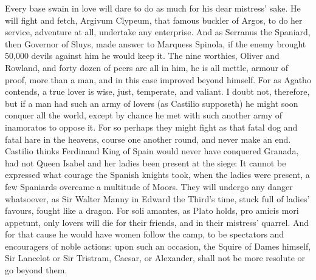 {Every base swain in love will dare to do as much for his dear mistress'
sake. He will fight and fetch, Argivum Clypeum, that famous
buckler of Argos, to do her service, adventure at all, undertake any
enterprise. And as Serranus the Spaniard, then Governor of Sluys, made
answer to Marquess Spinola, if the enemy brought 50,000 devils against
him he would keep it. The nine worthies, Oliver and Rowland, and forty
dozen of peers are all in him, he is all mettle, armour of proof, more
than a man, and in this case improved beyond himself. For as
Agatho contends, a true lover is wise, just, temperate, and
valiant. I doubt not, therefore, but if a man had such an army of
lovers (as Castilio supposeth) he might soon conquer all the world,
except by chance he met with such another army of inamoratos to oppose
it. For so perhaps they might fight as that fatal dog and fatal
hare in the heavens, course one another round, and never make an end.
Castilio thinks Ferdinand King of Spain would never have conquered
Granada, had not Queen Isabel and her ladies been present at the siege:
It cannot be expressed what courage the Spanish knights took,
when the ladies were present, a few Spaniards overcame a multitude of
Moors. They will undergo any danger whatsoever, as Sir Walter Manny in
Edward the Third's time, stuck full of ladies' favours, fought like a
dragon. For soli amantes, as Plato holds, pro amicis mori
appetunt, only lovers will die for their friends, and in their
mistress' quarrel. And for that cause he would have women follow the
camp, to be spectators and encouragers of noble actions: upon such an
occasion, the Squire of Dames himself, Sir Lancelot or Sir
Tristram, Caesar, or Alexander, shall not be more resolute or go beyond
them.

}
